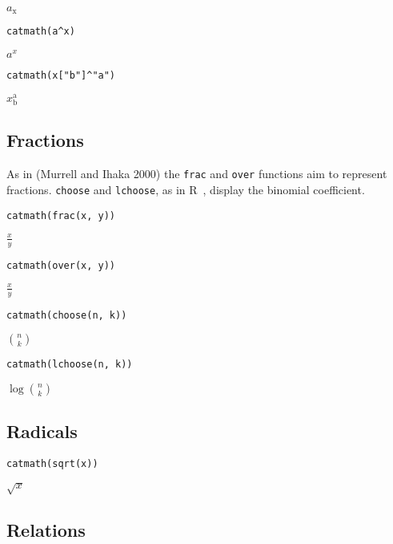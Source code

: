 \({{a}_\mathrm{x}}\)

\begin{verbatim}
catmath(a^x)
\end{verbatim}

\({{{a}}^{{x}}}\)

\begin{verbatim}
catmath(x["b"]^"a")
\end{verbatim}

\({{x}_\mathrm{b}^\mathrm{a}}\)

\hypertarget{fractions}{%
\subsection{Fractions}\label{fractions}}

As in (Murrell and Ihaka 2000) the \texttt{frac} and \texttt{over} functions aim to represent fractions. \texttt{choose} and \texttt{lchoose}, as in R~, display the binomial coefficient.

\begin{verbatim}
catmath(frac(x, y))
\end{verbatim}

\(\frac{{x}}{{y}}\)

\begin{verbatim}
catmath(over(x, y))
\end{verbatim}

\(\frac{{x}}{{y}}\)

\begin{verbatim}
catmath(choose(n, k))
\end{verbatim}

\(\binom{{n}}{{k}}\)

\begin{verbatim}
catmath(lchoose(n, k))
\end{verbatim}

\({\log\binom{{n}}{{k}}}\)

\hypertarget{radicals}{%
\subsection{Radicals}\label{radicals}}

\begin{verbatim}
catmath(sqrt(x))
\end{verbatim}

\(\sqrt{{x}}\)

\hypertarget{relations}{%
\subsection{Relations}\label{relations}}

